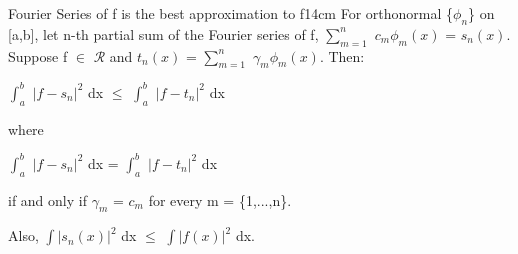     \newpage



    \begin{wtheorem}{Fourier Series of f is the best approximation to f}{14cm}
        For orthonormal \{$\phi_n$\} on [a,b], let n-th partial sum of the
        Fourier series of f, $\sum_{m=1}^n$ $c_m \phi_m(x)$ = $s_n(x)$. 
        Suppose f $\in$ $\mathscr{R}$ and
        $t_n(x)$ = $\sum_{m=1}^n$ $\gamma_m \phi_m(x)$. Then:

        \hspace{0.5cm}
        $\int_a^b$ $|f - s_n|^2$ dx $\leq$ $\int_a^b$ $|f - t_n|^2$ dx

        where
        
        \hspace{0.5cm}
        $\int_a^b$ $|f - s_n|^2$ dx = $\int_a^b$ $|f - t_n|^2$ dx

        if and only if $\gamma_m$ = $c_m$ for every m = \{1,...,n\}.

        Also, $\int |s_n(x)|^2$ dx $\leq$ $\int |f(x)|^2$ dx.
    \end{wtheorem}

